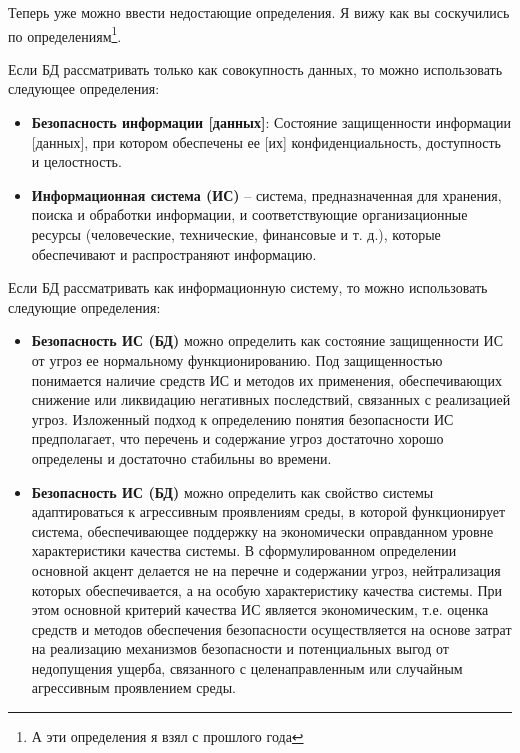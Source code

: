 Теперь уже можно ввести недостающие определения. Я вижу как вы соскучились по определениям\footnote{А эти определения я взял с прошлого года}. 
\begin{grayquote}
Если БД рассматривать только как совокупность данных, то можно использовать следующее определения:
\begin{itemize}
	\item \textbf{Безопасность информации [данных]}: Состояние защищенности информации [данных], при котором обеспечены ее [их] конфиденциальность, доступность и целостность.
	\item \textbf{Информационная система (ИС)} -- система, предназначенная для хранения, поиска и обработки информации, и соответствующие организационные ресурсы (человеческие, технические, финансовые и т. д.), которые обеспечивают и распространяют информацию.
\end{itemize}

Если БД рассматривать как информационную систему, то можно использовать следующие определения:
\begin{itemize}
	\item \textbf{Безопасность ИС (БД)} можно определить как состояние защищенности ИС от угроз ее нормальному функционированию. Под защищенностью понимается наличие средств ИС и методов их применения, обеспечивающих снижение или ликвидацию негативных последствий, связанных с реализацией угроз. Изложенный подход к определению понятия безопасности ИС предполагает, что перечень и содержание угроз достаточно хорошо определены и достаточно стабильны во времени.
	
	\item \textbf{Безопасность ИС (БД)} можно определить как свойство системы адаптироваться к агрессивным проявлениям среды, в которой функционирует система, обеспечивающее поддержку на экономически оправданном уровне характеристики качества системы. В сформулированном определении основной акцент делается не на перечне и содержании угроз, нейтрализация которых обеспечивается, а на особую характеристику качества системы. При этом основной критерий качества ИС является экономическим, т.е. оценка средств и методов обеспечения безопасности осуществляется на основе затрат на реализацию механизмов безопасности и потенциальных выгод от недопущения ущерба, связанного с целенаправленным или случайным агрессивным проявлением среды.
\end{itemize}
\end{grayquote}

